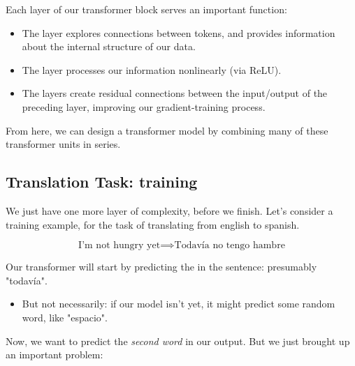         \begin{concept}
            Each layer of our transformer block serves an important function:

            \begin{itemize}
                \item The  layer explores connections between tokens, and provides information about the internal structure of our data.

                \item The  layer processes our information nonlinearly (via ReLU).

                \item The  layers create residual connections between the input/output of the preceding layer, improving our gradient-training process.
            \end{itemize}
        \end{concept}

        From here, we can design a transformer model by combining many of these transformer units in series.

        


    \pagebreak

    \subsection{Translation Task: training}

        We just have one more layer of complexity, before we finish. Let's consider a training example, for the task of translating from english to spanish.

        $$\text{I'm not hungry yet} \implies \text{Todavía no tengo hambre}$$

        Our transformer will start by predicting the  in the sentence: presumably "todavía".

            \begin{itemize}
                \item But not necessarily: if our model isn't  yet, it might predict some random word, like "espacio".
            \end{itemize}

        Now, we want to predict the \textit{second word} in our output. But we just brought up an important problem:

